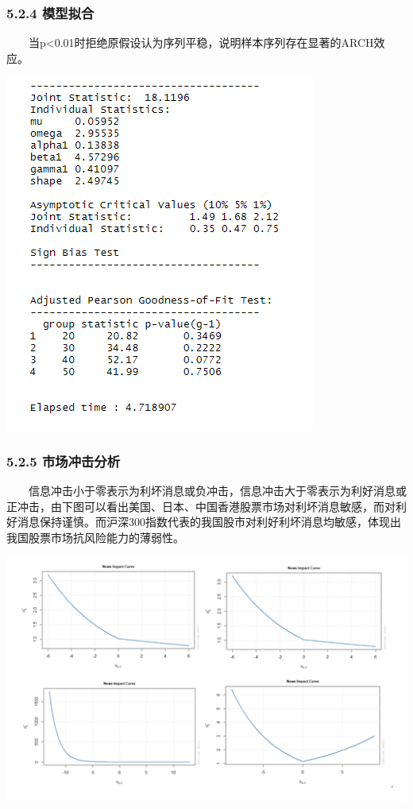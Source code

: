 \documentclass[
  11pt,
  letterpaper,
]{article}
\begin{document}
\hypertarget{ux6a21ux578bux62dfux5408}{%
\subsubsection{5.2.4 模型拟合}\label{ux6a21ux578bux62dfux5408}}

  当p\textless0.01时拒绝原假设认为序列平稳，说明样本序列存在显著的ARCH效应。

\includegraphics[width=0.7\linewidth]{./12}

\hypertarget{ux5e02ux573aux51b2ux51fbux5206ux6790}{%
\subsubsection{5.2.5
市场冲击分析}\label{ux5e02ux573aux51b2ux51fbux5206ux6790}}

  信息冲击小于零表示为利坏消息或负冲击，信息冲击大于零表示为利好消息或正冲击，由下图可以看出美国、日本、中国香港股票市场对利坏消息敏感，而对利好消息保持谨慎。而沪深300指数代表的我国股市对利好利坏消息均敏感，体现出我国股票市场抗风险能力的薄弱性。

\includegraphics[width=0.7\linewidth]{./13}
\end{document}
